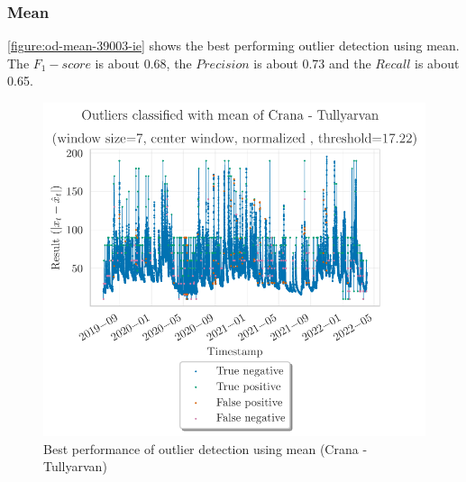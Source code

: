 \subsubsection{Mean}
\autoref{figure:od-mean-39003-ie} shows the best performing outlier detection using mean. The $F_1-score$ is about 0.68, the $Precision$ is about 0.73 and the $Recall$ is about 0.65.
\begin{figure}[htp]
    \centering 
    \includegraphics{plots/pdfs/39003-ie/od_mean_39003-ie_all.pdf}
    \caption{Best performance of outlier detection using mean (Crana - Tullyarvan)}
    \label{figure:od-mean-39003-ie}
\end{figure}

